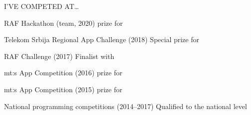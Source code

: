 \begin{minipage}[t]{\linewidth}\vspace{3mm}
{\alignRight\titleFont\light I'VE COMPETED AT\ldots}\linebreak\newline

\vspace{\contentTopMargin}
{\alignRight\rSubtitleFont\bold RAF Hackathon \light (team, 2020)}\newline
{\alignRight\largeContentFont\medium {} prize for }\newline

%
{\alignRight\rSubtitleFont\bold Telekom Srbija Regional App \alignRight Challenge \light (2018)}\newline
{\alignRight\largeContentFont\medium Special prize for }\newline

{\alignRight\rSubtitleFont\bold RAF Challenge \light (2017)}\newline
{\alignRight\largeContentFont\medium Finalist with }\newline

%
{\alignRight\rSubtitleFont\bold mt:s App Competition \light (2016)}\newline
{\alignRight\largeContentFont\medium {} prize for }\newline

{\alignRight\rSubtitleFont\bold mt:s App Competition \light (2015)}\newline
{\alignRight\largeContentFont\medium {} prize for }\newline

{\alignRight\rSubtitleFont\bold National programming \alignRight competitions \light (2014--2017)}\newline
{\alignRight\largeContentFont\medium Qualified to the national level}\newline


\end{minipage}
